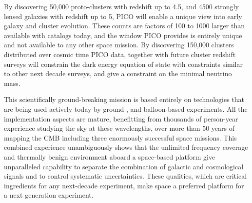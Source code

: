 \documentclass[PICOReport.tex]{subfiles}
\begin{document}
By discovering 50,000 proto-clusters with redshift up to 4.5, and  4500 strongly lensed galaxies with redshift up to 5, PICO will enable a unique view into early galaxy and cluster evolution. These counts are factors of 100 to 1000 larger than available with catalogs today, and the window PICO provides is entirely unique and not available to any other space mission. By discovering 150,000 clusters distributed over cosmic time PICO data, together with future cluster redshift surveys will constrain the dark energy equation of state with constraints similar to other next decade surveys, and give a constraint on the minimal neutrino mass. 

This scientifically ground-breaking mission is based entirely on technologies that are being used actively today by ground-, and balloon-based experiments. All the implementation aspects are mature, benefitting from thousands of person-year experience studying the sky at these wavelengths, over more than 50 years of mapping the CMB including three enormously successful space missions. This combined experience unambiguously shows that the unlimited frequency coverage and thermally benign environment aboard a space-based platform give unparalleled capability to separate the combination of galactic and cosmological signals and to control systematic uncertainties. These qualities, which are critical ingredients for any next-decade experiment, make space a preferred platform for a next generation experiment. 






\end{document}
